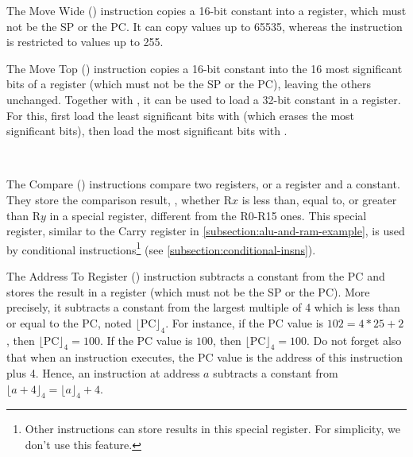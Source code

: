 \begin{Paragraph}
\end{Paragraph}

The Move Wide () instruction copies a 16-bit constant into a
register, which must not be the SP or the PC. It can copy values up to 65535,
whereas the  instruction is restricted to values up to 255.

\begin{Paragraph}
\end{Paragraph}

The Move Top () instruction copies a 16-bit constant into the 16 most
significant bits of a register (which must not be the SP or the PC), leaving
the others unchanged. Together with , it can be used to load a 32-bit
constant in a register. For this, first load the least significant bits with
 (which erases the most significant bits), then load the most
significant bits with .

\begin{Paragraph}
\\
\end{Paragraph}

The Compare () instructions compare two registers, or a register and a
constant. They store the comparison result, \eg, whether $\mathrm{R}x$ is less
than, equal to, or greater than $\mathrm{R}y$ in a special register, different
from the R0-R15 ones. This special register, similar to the Carry register in
\cref{subsection:alu-and-ram-example}, is used by conditional
instructions\footnote{Other instructions can store results in this special
register. For simplicity, we don't use this feature.} (see
\cref{subsection:conditional-insns}).

\begin{Paragraph}
\end{Paragraph}

The Address To Register () instruction subtracts a constant from the
PC and stores the result in a register (which must not be the SP or the PC).
More precisely, it subtracts a constant from the largest multiple of 4 which is
less than or equal to the PC, noted $\lfloor\mathrm{PC}\rfloor_4$. For
instance, if the PC value is $102=4*25+2$, then
$\lfloor\mathrm{PC}\rfloor_4=100$. If the PC value is $100$, then
$\lfloor\mathrm{PC}\rfloor_4=100$. Do not forget also that when an instruction
executes, the PC value is the address of this instruction plus 4. Hence, an
 instruction at address $a$ subtracts a constant from $\lfloor a+4
\rfloor_4=\lfloor a\rfloor_4+4$.

